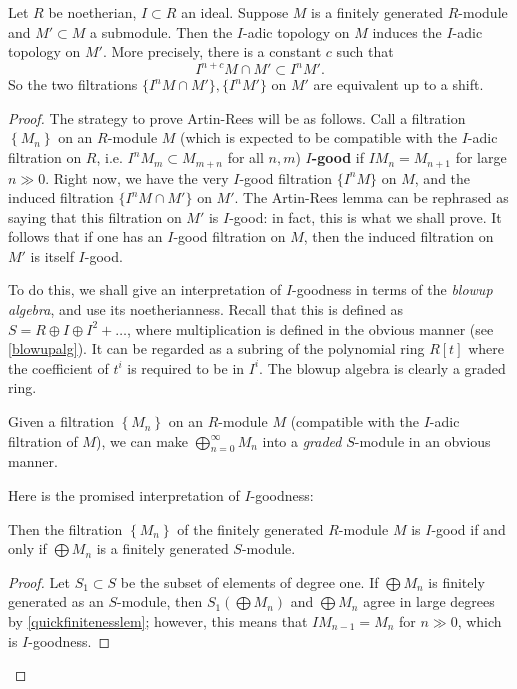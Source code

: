 \begin{theorem}
\label{artinrees}
Let $R$ be noetherian, $I \subset R$ an
ideal. Suppose $M$ is a finitely generated $R$-module and $M' \subset M$ a
submodule. Then the $I$-adic topology on $M$ induces the $I$-adic topology on $M'$.
More precisely,
there is a  constant $c$ such that
\[ I^{n+c} M \cap M' \subset I^n M'.  \]
So the two filtrations $\{I^n M \cap M'\}, \{I^n M'\}$ on $M'$ are equivalent up to a
shift.
\end{theorem} 
\begin{proof} 
The strategy to prove Artin-Rees will be as follows. Call a filtration
$\left\{M_n\right\}$ on an $R$-module $M$ (which is expected to be compatible
with the $I$-adic filtration on $R$, i.e. $I^n M_m \subset M_{m+n}$ for all
$n,m$) \textbf{$I$-good} if $I M_{n} = M_{n+1}$ for large $n \gg 0$.
Right now, we have the very $I$-good filtration $\{I^n M\}$ on $M$, and the induced
filtration $\{I^n M \cap M'\}$ on $M'$. The Artin-Rees lemma can be rephrased
as saying that this filtration on $M'$ is $I$-good: in fact, this is what we
shall prove.
It follows that if one has an $I$-good filtration on $M$, then the induced
filtration on  $M'$ is itself $I$-good.

To do this, we shall give an interpretation of $I$-goodness in terms of the 
\emph{blowup algebra}, and use its noetherianness.
Recall that this is defined as $S = R \oplus I \oplus I^2  +
\dots$, where multiplication is defined in the obvious manner (see
\cref{blowupalg}). It can be regarded as a subring
of the polynomial ring 
$R[t]$ where the coefficient of $t^i$ is required to be in $I^i$. 
The blowup algebra is clearly a graded ring.

Given a filtration $\left\{M_n\right\}$ on an $R$-module $M$ (compatible with
the $I$-adic filtration of $M$), we can  make $\bigoplus_{n=0}^{\infty} M_n$
into a \emph{graded} $S$-module in an obvious manner.

Here is the promised interpretation of $I$-goodness:
\begin{lemma} \label{subartinrees}
 Then the
filtration $\left\{M_n\right\}$ of the finitely generated $R$-module $M$ is
$I$-good if and only if $\bigoplus M_n$ is a finitely generated $S$-module.
\end{lemma} 
\begin{proof}
Let $S_1 \subset S$ be the subset of elements of degree one.
If $\bigoplus M_n$ is finitely generated as an $S$-module, then $S_1
(\bigoplus M_n) $ and $\bigoplus M_n$ agree in large degrees by
\cref{quickfinitenesslem};
however, this means that $IM_{n-1} = M_{n}$ for $n\gg 0$, which is $I$-goodness.


\end{proof}
\end{proof}
